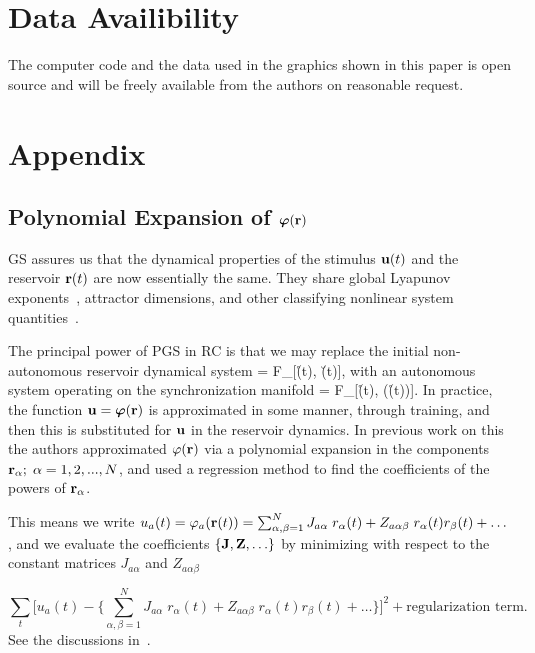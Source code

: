 \documentclass[12pt]{article}
\begin{document}
 \section*{Data Availibility}
 The computer code and the data used in the graphics shown in this paper is open source and will be freely available from the authors on reasonable request.

%

\newpage
\appendix
{}
\section{Appendix}

\subsection{Polynomial Expansion of $\mbox{$\boldsymbol{\varphi}$}(\mbox{{\bf r}})$}\label{poly}
GS assures us that the dynamical properties of the stimulus $\mbox{$\bf{u}$}(t)$ and the reservoir $\mbox{{\bf r}}(t)$ are now essentially the same. They share global Lyapunov exponents~\cite{ose68}, attractor dimensions, and other classifying nonlinear system quantities~\cite{sushchik95}.

The principal power of PGS in RC is that we may replace the initial non-autonomous reservoir dynamical system 
\be
     = F_{\alpha}[\r(t), \u(t)],
\ee
 with an autonomous system operating on the synchronization manifold \cite{Pecora97} %
\be
     = F_{\alpha}[\r(t), \bvarphi(\r(t))].
\ee
In practice, the function $\mbox{$\bf{u}$}=\mbox{$\boldsymbol{\varphi}$}(\mbox{{\bf r}})$ is approximated in some manner,  through training, and then this is substituted for $\mbox{$\bf{u}$}$ in the reservoir dynamics. 
In previous work on this~\cite{hunt19,ottdresden19} the authors approximated $\varphi(\mbox{{\bf r}})$ via a polynomial expansion in the components $\mbox{{\bf r}}_{\alpha};\; \alpha = 1,2,...,N$, and used a regression method to find the coefficients of the powers of $\mbox{{\bf r}}_{\alpha}$. 

This means we write $u_a(t) =\varphi_a(\mbox{{\bf r}}(t)) = \sum_{\alpha, \beta = 1}^N J_{a\alpha}\; r_{\alpha}(t) + Z_{a\alpha\beta}\; r_{\alpha}(t) r_{\beta}(t) + \ldots $, and we evaluate the coefficients $\{\mbox{$\bf{J}$},\mbox{$\bf{Z}$}, \ldots\}$ by minimizing with respect to the constant matrices $J_{a\alpha}$ and $Z_{a\alpha \beta}$

\begin{equation}
\sum_t \biggl [u_a(t) - \biggl\{ \sum_{\alpha, \beta = 1}^N J_{a\alpha}\; r_{\alpha}(t) + Z_{a\alpha \beta}\; r_{\alpha}(t) r_{\beta}(t) + \ldots \biggr\}\biggr ]^2 + \mbox{regularization term}.
\label{taylor1}
\end{equation}
See the discussions in~\cite{Tikhonov43,Phillips62,miller70,tikhonov77,Press-Flannery-2007-NumRecipes}.
\end{document}
